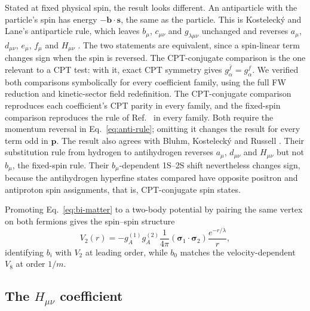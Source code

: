 \documentclass[
  aps,
  prd,
  reprint,
  amsmath,
  amssymb,
  nofootinbib,
  superscriptaddress,
  floatfix
]{revtex4-2}
\newcommand{\sig}{\bm{\sigma}}
\begin{document}
Stated at fixed physical spin, the result looks different. An antiparticle
with the particle's spin has energy $-\mathbf b\cdot\mathbf s$, the same
as the particle. This is Kostelecký and Lane's antiparticle rule, which
leaves $b_\mu$, $c_{\mu\nu}$ and $g_{\lambda\mu\nu}$ unchanged and reverses
$a_\mu$, $d_{\mu\nu}$, $e_\mu$, $f_\mu$ and $H_{\mu\nu}$
\cite{KosteleckyLane1999b}. The two statements are equivalent, since a
spin-linear term changes sign when the spin is reversed. The CPT-conjugate
comparison is the one relevant to a CPT test: with it, exact CPT symmetry
gives $g^{\bar f}_\alpha=g^f_\alpha$. We verified both comparisons
symbolically for every coefficient family, using the full FW reduction and
kinetic-sector field redefinition. The CPT-conjugate comparison reproduces
each coefficient's CPT parity in every family, and the fixed-spin
comparison reproduces the rule of Ref.~\cite{KosteleckyLane1999b} in every
family. Both require the momentum reversal in Eq.~\eqref{eq:anti-rule};
omitting it changes the result for every term odd in $\mathbf p$. The
result also agrees with Bluhm, Kostelecký and Russell \cite{Bluhm1999}.
Their substitution rule from hydrogen to antihydrogen reverses $a_\mu$,
$d_{\mu\nu}$ and $H_{\mu\nu}$ but not $b_\mu$, the fixed-spin rule. Their
$b_\mu$-dependent 1S--2S shift nevertheless changes sign, because the
antihydrogen hyperfine states compared have opposite positron and
antiproton spin assignments, that is, CPT-conjugate spin states.

Promoting Eq.~\eqref{eq:bi-matter} to a two-body potential by pairing the
same vertex on both fermions gives the spin--spin structure
\begin{equation}
  V_2(r) = -g_A^{(1)}g_A^{(2)}\frac{1}{4\pi}
           (\sig_1\cdot\sig_2)\frac{e^{-r/\lambda}}{r},
  \label{eq:V2}
\end{equation}
identifying $b_i$ with $V_2$ at leading order, while $b_0$ matches the
velocity-dependent $V_8$ at order $1/m$.

\subsection{The \texorpdfstring{$H_{\mu\nu}$}{H-mu-nu} coefficient}
\end{document}
